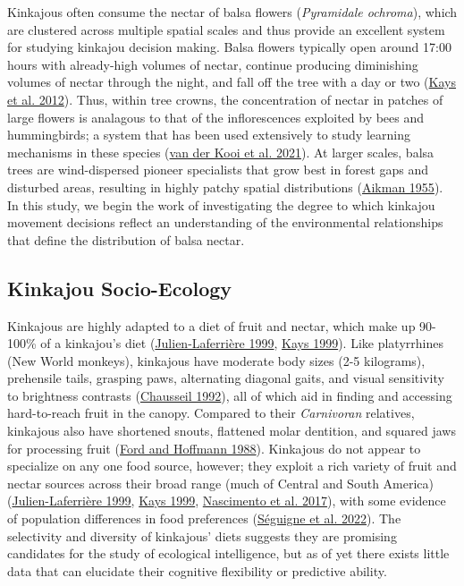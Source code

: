 \documentclass[twoside,12pt,final]{ucthesis-CA2012}
\begin{document}
\begin{ucmainmatter}
Kinkajous often consume the nectar of balsa flowers (\emph{Pyramidale ochroma}), which are clustered across multiple spatial scales and thus provide an excellent system for studying kinkajou decision making. Balsa flowers typically open around 17:00 hours with already-high volumes of nectar, continue producing diminishing volumes of nectar through the night, and fall off the tree with a day or two (\protect\hyperlink{ref-kays2012}{Kays et al. 2012}). Thus, within tree crowns, the concentration of nectar in patches of large flowers is analagous to that of the inflorescences exploited by bees and hummingbirds; a system that has been used extensively to study learning mechanisms in these species (\protect\hyperlink{ref-vanderkooi2021}{van der Kooi et al. 2021}). At larger scales, balsa trees are wind-dispersed pioneer specialists that grow best in forest gaps and disturbed areas, resulting in highly patchy spatial distributions (\protect\hyperlink{ref-aikman1955}{Aikman 1955}). In this study, we begin the work of investigating the degree to which kinkajou movement decisions reflect an understanding of the environmental relationships that define the distribution of balsa nectar.

\hypertarget{kinkajou-socio-ecology}{%
\subsection{Kinkajou Socio-Ecology}\label{kinkajou-socio-ecology}}

Kinkajous are highly adapted to a diet of fruit and nectar, which make up 90-100\% of a kinkajou's diet (\protect\hyperlink{ref-julien-laferriere1999}{Julien-Laferrière 1999}, \protect\hyperlink{ref-kays1999a}{Kays 1999}). Like platyrrhines (New World monkeys), kinkajous have moderate body sizes (2-5 kilograms), prehensile tails, grasping paws, alternating diagonal gaits, and visual sensitivity to brightness contrasts (\protect\hyperlink{ref-chausseil1992}{Chausseil 1992}), all of which aid in finding and accessing hard-to-reach fruit in the canopy. Compared to their \emph{Carnivoran} relatives, kinkajous also have shortened snouts, flattened molar dentition, and squared jaws for processing fruit (\protect\hyperlink{ref-ford1988}{Ford and Hoffmann 1988}). Kinkajous do not appear to specialize on any one food source, however; they exploit a rich variety of fruit and nectar sources across their broad range (much of Central and South America) (\protect\hyperlink{ref-julien-laferriere1999}{Julien-Laferrière 1999}, \protect\hyperlink{ref-kays1999a}{Kays 1999}, \protect\hyperlink{ref-nascimento2017}{Nascimento et al. 2017}), with some evidence of population differences in food preferences (\protect\hyperlink{ref-seguigne2022}{Séguigne et al. 2022}). The selectivity and diversity of kinkajous' diets suggests they are promising candidates for the study of ecological intelligence, but as of yet there exists little data that can elucidate their cognitive flexibility or predictive ability.


\end{ucmainmatter}
\end{document}
